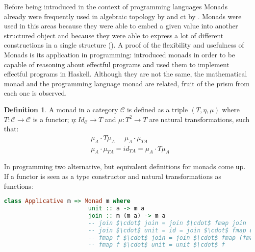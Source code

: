 \documentclass[
  oneside,
  11pt, a4paper,
  footinclude=true,
  headinclude=true,
  cleardoublepage=empty
]{scrbook}
\theoremstyle{definition}
\newtheorem{definition}{Definition}[section]
\theoremstyle{definition}
\begin{document}
	            Before being introduced in the context of programming languages Monads already were frequently used in algebraic topology by \cite{godement1958topologie} and \gls{ct} by \cite{maclane:71}. Monads were used in this areas because they were able to embed a given value into another structured object and because they were able to express a lot of different constructions in a single structure (\cite{DBLP:journals/corr/abs-1803-10195}). A proof of the flexibility and usefulness of Monads is its application in programming: \cite{Moggi:1991:NCM:116981.116984} introduced monads in order to be capable of reasoning about effectful programs and \cite{1995_wadler_monads} used them to implement effectful programs in Haskell. Although they are not the same, the mathematical monad and the programming language monad are related, fruit of the prism from each one is observed.
	            
	            \begin{definition}{A monad in a category $\mathscr{C}$ is defined as a triple $(T,\eta, \mu)$ where $T : \mathscr{C} \rightarrow \mathscr{C}$ is a functor; $\eta : Id_\mathscr{C} \rightarrow T$ and $\mu : T^2 \rightarrow T$ are natural transformations, such that:}
	                \begin{align*}
	                    &\mu_A \cdot T\mu_A = \mu_A \cdot \mu_{TA} \\
	                    &\mu_A \cdot \mu_{TA} = id_{TA} = \mu_A \cdot T\mu_A
	                \end{align*}{}
	            \end{definition}
	            
	            In programming two alternative, but equivalent definitions for monads come up. If a functor is seen as a type constructor and natural transformations as functions:
	            
	            \begin{lstlisting}[mathescape, language=Haskell, caption={Monad laws and definition in terms of \texttt{unit} and \texttt{join}},captionpos=b]
	                class Applicative m => Monad m where
	                    unit :: a -> m a
	                    join :: m (m a) -> m a
	                    -- join $\cdot$ join = join $\cdot$ fmap join
	                    -- join $\cdot$ unit = id = join $\cdot$ fmap unit
	                    -- fmap f $\cdot$ join = join $\cdot$ fmap (fmap f)
	                    -- fmap f $\cdot$ unit = unit $\cdot$ f
	            \end{lstlisting}{}
	            
\end{document}
